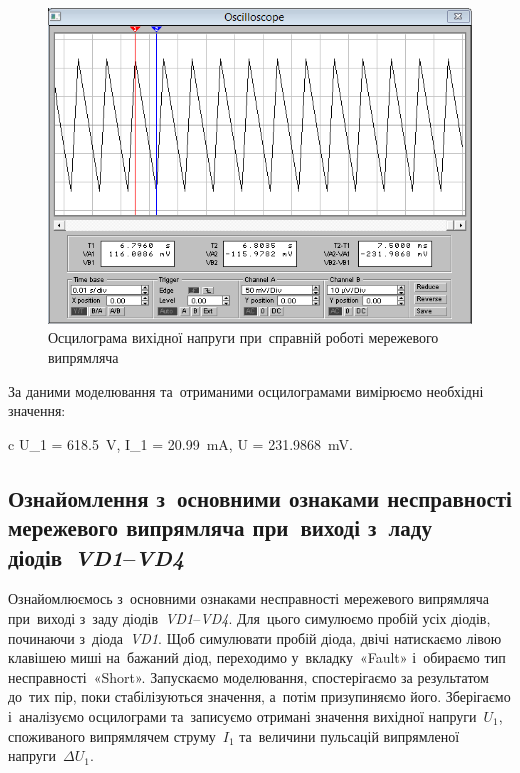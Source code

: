 \documentclass[
	a4paper,
	oneside,
	BCOR = 10mm,
	DIV = 12,
	12pt,
	headings = normal,
]{scrartcl}
\newcommand{\schel}[1]{\textit{#1}}
\begin{document}
			\begin{figure}[!htbp]
				\centering
				\includegraphics[height = 8\baselineskip]{./assets/y03s02-pcdiag-lab-01-p01-03b.png}
				\caption{Осцилограма вихідної напруги при~справній роботі мережевого випрямляча}
				\label{fig:ewb-scope-01-03}
			\end{figure}
			
			За даними моделювання та~отриманими осцилограмами вимірюємо необхідні значення:
			\begin{IEEEeqnarray*}{c}
				U_1 = \SI{618.5}{\volt}, \quad 
				I_1 = \SI{20.99}{\milli\ampere}, \quad
				\Delta U = \SI{231.9868}{\milli\volt}. 
			\end{IEEEeqnarray*}

		\subsection{Ознайомлення з~основними ознаками несправності мережевого випрямляча при~виході з~ладу діодів~\schel{VD1}–\schel{VD4}}
			Ознайомлюємось з~основними ознаками несправності мережевого випрямляча при~виході з~заду діодів~\schel{VD1}–\schel{VD4}. Для~цього симулюємо пробій усіх діодів, починаючи з~діода~\schel{VD1}. Щоб симулювати пробій діода, двічі натискаємо лівою клавішею миші на~бажаний діод, переходимо у~вкладку~«\textenglish{Fault}» і~обираємо тип несправності~«\textenglish{Short}». Запускаємо моделювання, спостерігаємо за результатом до~тих пір, поки стабілізуються значення, а~потім призупиняємо його. Зберігаємо і~аналізуємо осцилограми та~записуємо отримані значення вихідної напруги~$U_1$, споживаного випрямлячем струму~$I_1$ та~величини пульсацій випрямленої напруги~$\Delta U_1$. 
			
\end{document}
